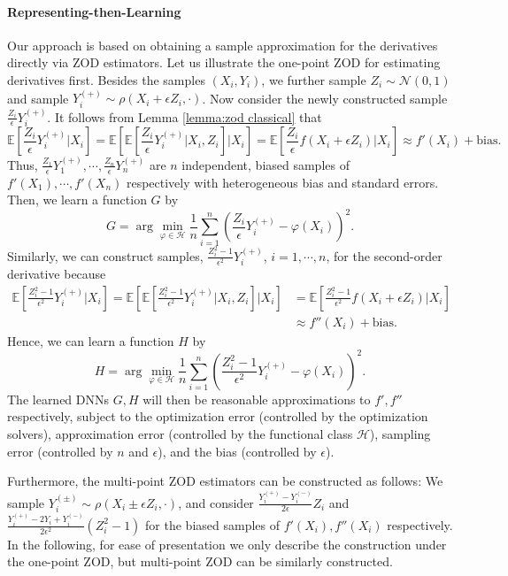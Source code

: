 \documentclass[twoside,11pt]{article}
\newcommand{\E}{\mathbb{E}}
\newcommand{\1}{\mathbf{1}}
\numberwithin{equation}{section}
\begin{document}
\paragraph{Representing-then-Learning} Our approach is based on obtaining a sample approximation for the derivatives directly via ZOD estimators. Let us illustrate the one-point ZOD for estimating derivatives first. Besides the samples $(X_i,Y_i)$, we further sample $Z_i \sim \mathcal N(0,1)$ and sample $Y_i^{(+)} \sim \rho(X_i + \epsilon Z_i,\cdot)$. Now consider the newly constructed sample $\frac{Z_i}{\epsilon} Y_i^{(+)}$. It follows from Lemma \ref{lemma:zod classical} that
\[ \E\left[ \frac{Z_i}{\epsilon} Y_i^{(+)} \Big| X_i \right] =  \E\left[ \E\left[ \frac{Z_i}{\epsilon} Y_i^{(+)} \Big|X_i,Z_i\right] \Big| X_i  \right]  = \E\left[ \frac{Z_i}{\epsilon} f(X_i+\epsilon Z_i) \Big|X_i \right] \approx f'(X_i) + \text{bias} . \]
Thus, $\frac{Z_1}{\epsilon} Y_1^{(+)},\cdots,\frac{Z_n}{\epsilon} Y_n^{(+)}$ are $n$ independent, biased samples of $f'(X_1),\cdots,f'(X_n)$ respectively with heterogeneous bias and standard errors. Then, we learn a function $G$ by
\[ G = \arg\min_{\varphi\in \mathcal H} \frac{1}{n}\sum_{i=1}^n \left(  \frac{Z_i}{\epsilon} Y_i^{(+)} - \varphi(X_i) \right)^2 .\]
Similarly, we can construct samples, $\frac{Z_i^2 - 1}{\epsilon^2} Y_i^{(+)} $, $i=1,\cdots,n$,  for the second-order derivative because
\[
\begin{aligned}\E\left[ \frac{Z_i^2- 1}{\epsilon^2} Y_i^{(+)} \Big| X_i \right] =  \E\left[ \E\left[ \frac{Z_i^2-1}{\epsilon^2} Y_i^{(+)} \Big| X_i, Z_i \right] \Big|X_i \right] &= \E\left[ \frac{Z_i^2-1}{\epsilon^2} f(X_i+\epsilon Z_i) \Big|X_i \right]\\
&\approx f''(X_i) + \text{bias} .
\end{aligned}
\]
Hence, we can learn a function $H$ by
\[  H = \arg\min_{\varphi\in \mathcal H} \frac{1}{n}\sum_{i=1}^n \left(  \frac{Z_i^2-1}{\epsilon^2} Y_i^{(+)} - \varphi(X_i) \right)^2 .\]
The learned DNNs $G,H$ will then be reasonable approximations to $f',f''$ respectively, subject to the optimization error (controlled by the optimization solvers), approximation error (controlled by the functional class $\mathcal H$), sampling error (controlled by $n$ and $\epsilon$), and the bias (controlled by $\epsilon$).



Furthermore, the multi-point ZOD estimators can be constructed as follows: We sample $Y_i^{(\pm)} \sim \rho(X_i \pm \epsilon Z_i,\cdot)$, and consider $\frac{Y_i^{(+)} - Y_i^{(-)}}{2\epsilon}Z_i$ and $\frac{Y_i^{(+)} - 2Y_i + Y_i^{(-)}}{2\epsilon^2}\left( Z_i^2-1\right)$ for the biased samples of $f'(X_i),f''(X_i)$ respectively. In the following, for ease of presentation we only describe the construction under the one-point ZOD, but multi-point ZOD can be similarly constructed.
\end{document}
